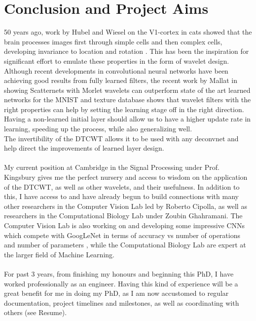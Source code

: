 \documentclass[12pt, a4paper, oneside, english]{article}
\begin{document}
\section{Conclusion and Project Aims}
50 years ago, work by Hubel and Wiesel on the V1-cortex in cats showed that the brain processes images first through simple cells and then complex cells, developing invariance to location and rotation \cite{hubel_receptive_1962}. This has been the inspiration for significant effort to emulate these properties in the form of wavelet design.\\
Although recent developments in convolutional neural networks have been achieving good results from fully learned filters, the recent work by Mallat in showing Scatternets with Morlet wavelets can outperform state of the art learned networks for the MNIST and texture database shows that wavelet filters with the right properties can help by setting the learning stage off in the right direction.\\
Having a non-learned initial layer should allow us to have a higher update rate in learning, speeding up the process, while also generalizing well.\\
The invertibility of the DTCWT allows it to be used with any deconvnet and help direct the improvements of learned layer design.\\\\
My current position at Cambridge in the Signal Processing under Prof. Kingsbury gives me the perfect nursery and access to wisdom on the application of the DTCWT, as well as other wavelets, and their usefulness. In addition to this, I have access to and have already begun to build connections with many other researchers in the Computer Vision Lab led by Roberto Cipolla, as well as researchers in the Computational Biology Lab under Zoubin Ghahramani. The Computer Vision Lab is also working on and developing some impressive CNNs which compete with GoogLeNet in terms of accuracy vs number of operations and number of parameters \cite{ioannou_training_2015}, while the Computational Biology Lab are expert at the larger field of Machine Learning.
\\\\
For past 3 years, from finishing my honours and beginning this PhD, I have worked professionally as an engineer. Having this kind of experience will be a great benefit for me in doing my PhD, as I am now accustomed to regular documentation, project timelines and milestones, as well as coordinating with others (see Resume).\\\\
\end{document}
